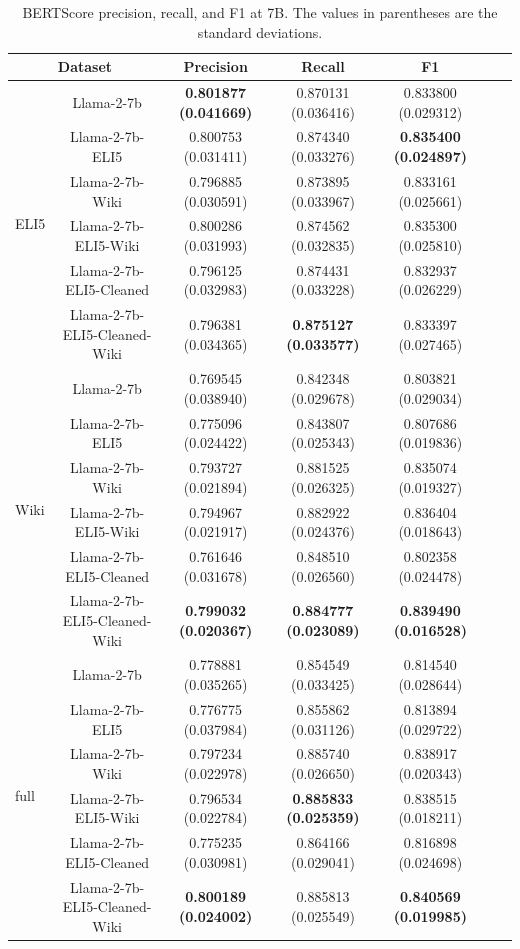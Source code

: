 \documentclass[11pt, oneside]{article}   	%
\begin{document}
\begin{table}[ht]
\hspace{-.75in}
\begin{tabular}{lcccccc}
\toprule
\multicolumn{2}{c}{Dataset} & \multicolumn{1}{c}{Precision} & \multicolumn{1}{c}{Recall} & \multicolumn{1}{c}{F1} \\
\midrule
\multirow{6}{*}{ELI5} & Llama-2-7b & \textbf{0.801877 (0.041669)} & 0.870131 (0.036416) & 0.833800 (0.029312) \\
& Llama-2-7b-ELI5 & 0.800753 (0.031411) & 0.874340 (0.033276) & \textbf{0.835400 (0.024897)} \\
& Llama-2-7b-Wiki & 0.796885 (0.030591) & 0.873895 (0.033967) & 0.833161 (0.025661) \\
& Llama-2-7b-ELI5-Wiki & 0.800286 (0.031993) & 0.874562 (0.032835) & 0.835300 (0.025810) \\
& Llama-2-7b-ELI5-Cleaned & 0.796125 (0.032983) & 0.874431 (0.033228) & 0.832937 (0.026229) \\
& Llama-2-7b-ELI5-Cleaned-Wiki & 0.796381 (0.034365) & \textbf{0.875127 (0.033577)} & 0.833397 (0.027465) \\
\midrule
\multirow{6}{*}{Wiki} & Llama-2-7b & 0.769545 (0.038940) & 0.842348 (0.029678) & 0.803821 (0.029034) \\
& Llama-2-7b-ELI5 & 0.775096 (0.024422) & 0.843807 (0.025343) & 0.807686 (0.019836) \\
& Llama-2-7b-Wiki & 0.793727 (0.021894) & 0.881525 (0.026325) & 0.835074 (0.019327) \\
& Llama-2-7b-ELI5-Wiki & 0.794967 (0.021917) & 0.882922 (0.024376) & 0.836404 (0.018643) \\
& Llama-2-7b-ELI5-Cleaned & 0.761646 (0.031678) & 0.848510 (0.026560) & 0.802358 (0.024478) \\
& Llama-2-7b-ELI5-Cleaned-Wiki & \textbf{0.799032 (0.020367)} & \textbf{0.884777 (0.023089)} & \textbf{0.839490 (0.016528)} \\
\midrule
\multirow{6}{*}{full} & Llama-2-7b & 0.778881 (0.035265) & 0.854549 (0.033425) & 0.814540 (0.028644) \\
& Llama-2-7b-ELI5 & 0.776775 (0.037984) & 0.855862 (0.031126) & 0.813894 (0.029722) \\
& Llama-2-7b-Wiki & 0.797234 (0.022978) & 0.885740 (0.026650) & 0.838917 (0.020343) \\
& Llama-2-7b-ELI5-Wiki & 0.796534 (0.022784) & \textbf{0.885833 (0.025359)} & 0.838515 (0.018211) \\
& Llama-2-7b-ELI5-Cleaned & 0.775235 (0.030981) & 0.864166 (0.029041) & 0.816898 (0.024698) \\
& Llama-2-7b-ELI5-Cleaned-Wiki & \textbf{0.800189 (0.024002)} & 0.885813 (0.025549) & \textbf{0.840569 (0.019985)} \\
\bottomrule
\end{tabular}
\caption{BERTScore precision, recall, and F1 at 7B. The values in parentheses are the standard deviations.}
\label{tab:bertscores_7b}
\end{table}
\end{document}
